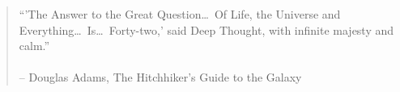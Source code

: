 





	\frontmatter
		
		
		
		\newpage
		\thispagestyle{empty}
		\hspace{1cm}
		\newpage
		\thispagestyle{empty}
		\vspace*{\fill} 
		\begin{quote} 
			\hfill ``'The Answer to the Great Question\ldots~Of Life, the Universe and Everything\ldots~Is\ldots~Forty-two,' said Deep Thought, with infinite majesty and calm.''\\ 
			\\
			\hfill – Douglas Adams, The Hitchhiker's Guide to the Galaxy

		\end{quote}
		\vspace*{\fill}
		\newpage
		\tableofcontents
	\mainmatter
		
		
		
		
	\backmatter
		
	\appendix
		\printbibliography[title={Quellenverzeichnis}]
		\printglossary[type=\acronymtype, title=Abkürzungsverzeichnis,toctitle=Abk\"urzungsverzeichnis]%
		\printglossary[type=main, title=Glossar,toctitle=Glossar]
		\listoftables
		\listoffigures
		\listoflistings
		

